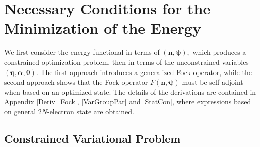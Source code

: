 \documentclass[aps,preprint]{revtex4}%
\begin{document}
\section{Necessary Conditions for the Minimization of the Energy
\label{Evariation}}

We first consider the energy functional in terms of $\left(
\bm{n,\psi }\right)  ,$ which produces a constrained optimization problem,
then in terms of the unconstrained variables $\left(
\bm{\eta},\bm{\alpha },\bm{\theta}\right)  $. The first approach introduces a
generalized Fock operator, while the second approach shows that the Fock
operator $F\left(  \bm{n,\psi}\right)  $ must be self adjoint when based on an
optimized state. The details of the derivations are contained in Appendix
\ref{Deriv_Fock}, \ref{VarGroupPar} and \ref{StatCon}, where expressions based
on general $2N$-electron state are obtained.

\subsection{Constrained Variational Problem\label{CVP}}
\end{document}
